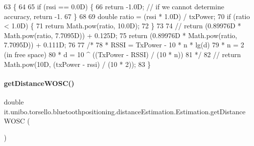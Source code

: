 \begin{DoxyCode}
63                                                                   \{
64 
65         \textcolor{keywordflow}{if} (rssi == 0.0D) \{
66             \textcolor{keywordflow}{return} -1.0D; \textcolor{comment}{// if we cannot determine accuracy, return -1.}
67         \}
68 
69         \textcolor{keywordtype}{double} ratio = (rssi * 1.0D) / txPower;
70         \textcolor{keywordflow}{if} (ratio < 1.0D) \{
71             \textcolor{keywordflow}{return} Math.pow(ratio, 10.0D);
72         \}
73 
74 \textcolor{comment}{//        return (0.89976D * Math.pow(ratio, 7.7095D)) + 0.125D;}
75         \textcolor{keywordflow}{return} (0.89976D * Math.pow(ratio, 7.7095D)) + 0.111D;
76 
77     \textcolor{comment}{/*}
78 \textcolor{comment}{     * RSSI = TxPower - 10 * n * lg(d)}
79 \textcolor{comment}{     * n = 2 (in free space)}
80 \textcolor{comment}{     * d = 10 ^ ((TxPower - RSSI) / (10 * n))}
81 \textcolor{comment}{     */}
82         \textcolor{comment}{// return Math.pow(10D, (txPower - rssi) / (10 * 2));}
83     \}
\end{DoxyCode}
\hypertarget{classit_1_1unibo_1_1torsello_1_1bluetoothpositioning_1_1distanceEstimation_1_1Estimation_a5c7bce21cd77c98a8d1e6df4c930397c_a5c7bce21cd77c98a8d1e6df4c930397c}{}\label{classit_1_1unibo_1_1torsello_1_1bluetoothpositioning_1_1distanceEstimation_1_1Estimation_a5c7bce21cd77c98a8d1e6df4c930397c_a5c7bce21cd77c98a8d1e6df4c930397c} 
\paragraph{\texorpdfstring{get\+Distance\+W\+O\+S\+C()}{getDistanceWOSC()}}
{\footnotesize\ttfamily double it.\+unibo.\+torsello.\+bluetoothpositioning.\+distance\+Estimation.\+Estimation.\+get\+Distance\+W\+O\+SC (\begin{DoxyParamCaption}{ }\end{DoxyParamCaption})}


